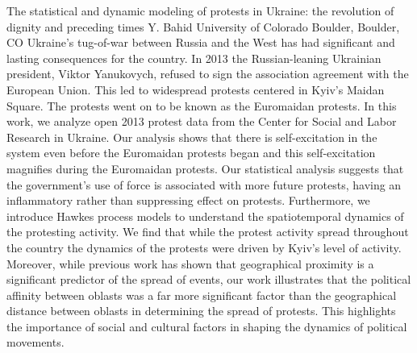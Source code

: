 
    \begin{abstract_online}{The statistical and dynamic modeling of protests in Ukraine: the revolution of dignity and preceding times}{%
        Y. Bahid}{%
        }{%
        University of Colorado Boulder, Boulder, CO}
    Ukraine's tug-of-war between Russia and the West has had significant and lasting consequences for the country.  In 2013 the Russian-leaning Ukrainian president, Viktor Yanukovych,  refused to sign the association agreement with the European Union. This led to widespread protests centered in Kyiv's Maidan Square.  The protests went on to be known as the Euromaidan protests.  In this work, we analyze open 2013 protest data  from the Center for Social and Labor Research in Ukraine.  Our analysis shows that there is self-excitation in the system even before the Euromaidan protests began and this self-excitation magnifies during the Euromaidan protests.  Our statistical analysis suggests that the government's use of force is associated with more future protests, having an inflammatory rather than suppressing effect on protests. Furthermore, we introduce Hawkes process models to understand the spatiotemporal dynamics of the protesting activity.  We find that while the protest activity spread throughout the country the dynamics of the protests were driven by Kyiv's level of activity.  Moreover, while previous work has shown that geographical proximity is a significant predictor of the spread of events, our work illustrates that the political affinity between oblasts was a far more significant factor than the geographical distance between oblasts in determining the spread of protests. This highlights the importance of social and cultural factors in shaping the dynamics of political movements. 
    
    \end{abstract_online}
    